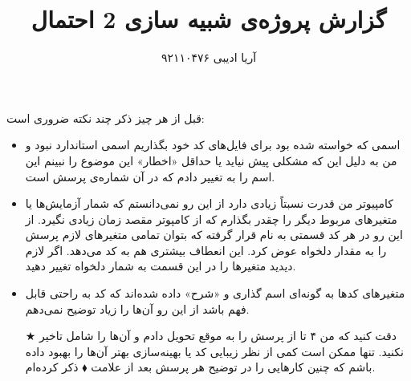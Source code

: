 \documentclass[10pt]{article}
\title{گزارش پروژه‌ی شبیه سازی 2 احتمال}
\author{آریا ادیبی ۹۲۱۱۰۴۷۶}
\date{}
\theoremstyle{definition}
\theoremstyle{lemma}
\theoremstyle{theorem}
\theoremstyle{remark}
\begin{document}
	\maketitle
	
	 قبل از هر چیز ذکر چند نکته ضروری است:
	 \begin{itemize}
	 	\item
	 	اسمی که خواسته شده بود برای فایل‌های کد خود بگذاریم اسمی استاندارد نبود و من به دلیل
	 	این که مشکلی پیش نیاید یا حداقل «اخطار» این موضوع را نبینم این اسم را به
	 	تغییر دادم که در آن
	 	شماره‌ی پرسش است.
	 	\item
	 	کامپیوتر من قدرت نسبتاً زیادی دارد از این رو نمی‌دانستم که شمار آزمایش‌ها یا متغیر‌های 
	 	مربوط دیگر را چقدر بگذارم که از کامپوتر مقصد زمان زیادی نگیرد. از این رو در هر کد 
	 	قسمتی به نام
	 	قرار گرفته که بتوان تمامی متغیر‌های لازم پرسش را به مقدار دلخواه عوض کرد. این انعطاف
	 	بیشتری هم به کد می‌دهد. اگر لازم دیدید متغیر‌ها را در این قسمت به شمار دلخواه تغییر دهید.
	 	\item
	 	متغیر‌های کد‌ها به گونه‌ای اسم گذاری و «شرح» داده شده‌اند که کد به راحتی قابل فهم باشد
	 	از این رو آن‌ها را زیاد توضیح نمی‌دهم.
	 	\item [\large $\bigstar$]
	 	دقت کنید که من ۴ تا از پرسش را به موقع تحویل دادم و آن‌ها را شامل تاخیر نکنید. تنها ممکن
	 	است کمی از نظر زیبایی کد یا بهینه‌سازی بهتر آن‌ها را بهبود داده باشم که چنین کار‌هایی
	 	را در توضیح هر پرسش بعد از علامت
	 	$\blacklozenge$
	 	ذکر کرده‌ام.
	 \end{itemize}
 	
\end{document}
